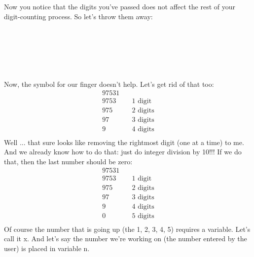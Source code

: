 Now you notice that the digits you've passed does not
affect the rest of your digit-counting process. So let's
throw them away:\\
\\
\\
\\
\\
\\
\\

Now, the symbol for our finger doesn't help.
Let's get rid of that too:\\

\begin{align*}
97531\\
9753 &\quad\text{1 digit}\\
975 &\quad\text{2 digits}\\
97 &\quad\text{3 digits}\\
9 &\quad\text{4 digits}\\
\end{align*}
Well ... that sure looks like removing the rightmost digit (one at a
time) to me. And we already know how to do that: just do integer
division by 10!!! If we do that, then the last number should be zero:\\
\begin{align*}
97531\\
9753 &\quad\text{1 digit}\\
975 &\quad\text{2 digits}\\
97 &\quad\text{3 digits}\\
9 &\quad\text{4 digits}\\
0 &\quad\text{5 digits}\\
\end{align*}
Of course the number that is going up (the 1, 2, 3, 4, 5) requires a
variable. Let's call it x. And let's say
the number we're working on (the number entered by the
user) is placed in variable n.

